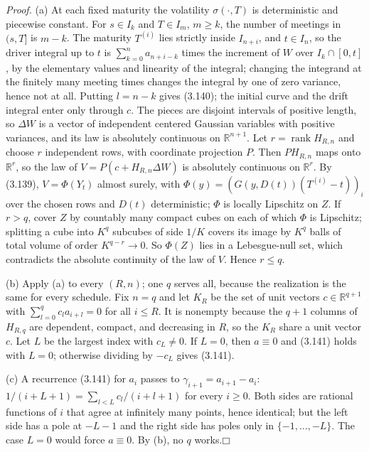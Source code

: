 \documentclass[11pt]{article}
\providecommand{\square}{\mdlgwhtsquare}
\begin{document}
\emph{Proof.} (a) At each fixed maturity the volatility \(\sigma(\cdot,T)\) is deterministic and piecewise constant. For \(s\in I_k\) and \(T\in I_m\), \(m\ge k\), the number of meetings in \((s,T]\) is \(m-k\). The maturity \(T^{(i)}\) lies strictly inside \(I_{n+i}\), and \(t\in I_n\), so the driver integral up to \(t\) is \(\sum_{k=0}^na_{n+i-k}\) times the increment of \(W\) over \(I_k\cap[0,t]\), by the elementary values and linearity of the integral; changing the integrand at the finitely many meeting times changes the integral by one of zero variance, hence not at all. Putting \(l=n-k\) gives (3.140); the initial curve and the drift integral enter only through \(c\). The pieces are disjoint intervals of positive length, so \(\Delta W\) is a vector of independent centered Gaussian variables with positive variances, and its law is absolutely continuous on \(\mathbb R^{n+1}\). Let \(r=\operatorname{rank}H_{R,n}\) and choose \(r\) independent rows, with coordinate projection \(P\). Then \(PH_{R,n}\) maps onto \(\mathbb R^r\), so the law of \(V=P(c+H_{R,n}\Delta W)\) is absolutely continuous on \(\mathbb R^r\). By (3.139), \(V=\Phi(Y_t)\) almost surely, with \(\Phi(y)=(G(y,D(t))(T^{(i)}-t))_{i}\) over the chosen rows and \(D(t)\) deterministic; \(\Phi\) is locally Lipschitz on \(Z\). If \(r>q\), cover \(Z\) by countably many compact cubes on each of which \(\Phi\) is Lipschitz; splitting a cube into \(K^q\) subcubes of side \(1/K\) covers its image by \(K^q\) balls of total volume of order \(K^{q-r}\to0\). So \(\Phi(Z)\) lies in a Lebesgue-null set, which contradicts the absolute continuity of the law of \(V\). Hence \(r\le q\).

(b) Apply (a) to every \((R,n)\); one \(q\) serves all, because the realization is the same for every schedule. Fix \(n=q\) and let \(K_R\) be the set of unit vectors \(c\in\mathbb R^{q+1}\) with \(\sum_{l=0}^qc_la_{i+l}=0\) for all \(i\le R\). It is nonempty because the \(q+1\) columns of \(H_{R,q}\) are dependent, compact, and decreasing in \(R\), so the \(K_R\) share a unit vector \(c\). Let \(L\) be the largest index with \(c_L\neq0\). If \(L=0\), then \(a\equiv0\) and (3.141) holds with \(L=0\); otherwise dividing by \(-c_L\) gives (3.141).

(c) A recurrence (3.141) for \(a_i\) passes to \(\gamma_{i+1}=a_{i+1}-a_i\): \(1/(i+L+1)=\sum_{l<L}c_l/(i+l+1)\) for every \(i\ge0\). Both sides are rational functions of \(i\) that agree at infinitely many points, hence identical; but the left side has a pole at \(-L-1\) and the right side has poles only in \(\{-1,\dots,-L\}\). The case \(L=0\) would force \(a\equiv0\). By (b), no \(q\) works.\hfill$\square$
\end{document}
